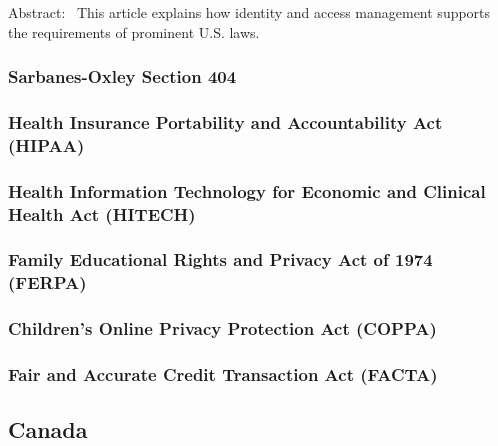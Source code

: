 Abstract:~ This article explains how identity and access management
supports the requirements of prominent U.S. laws.

\hypertarget{sarbanes-oxley-section-404}{%
\subsubsection{Sarbanes-Oxley Section
404}\label{sarbanes-oxley-section-404}}

\hypertarget{health-insurance-portability-and-accountability-act-hipaa}{%
\subsubsection{Health Insurance Portability and Accountability Act
(HIPAA)}\label{health-insurance-portability-and-accountability-act-hipaa}}

\hypertarget{health-information-technology-for-economic-and-clinical-health-act-hitech}{%
\subsubsection{Health Information Technology for Economic and Clinical
Health Act
(HITECH)}\label{health-information-technology-for-economic-and-clinical-health-act-hitech}}

\hypertarget{family-educational-rights-and-privacy-act-of-1974-ferpa}{%
\subsubsection{Family Educational Rights and Privacy Act of 1974
(FERPA)}\label{family-educational-rights-and-privacy-act-of-1974-ferpa}}

\hypertarget{childrens-online-privacy-protection-act-coppa}{%
\subsubsection{Children's Online Privacy Protection Act
(COPPA)}\label{childrens-online-privacy-protection-act-coppa}}

\hypertarget{fair-and-accurate-credit-transaction-act-facta}{%
\subsubsection{Fair and Accurate Credit Transaction Act
(FACTA)}\label{fair-and-accurate-credit-transaction-act-facta}}

\hypertarget{canada}{%
\subsection{Canada}\label{canada}}

